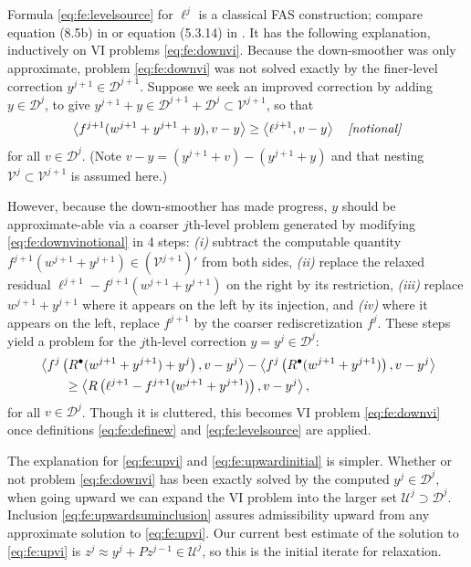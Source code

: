 \documentclass[review,hidelinks,onefignum,onetabnum,final]{siamart220329}  %
\newcommand{\cV}{\mathcal{V}}
\newcommand{\ip}[2]{\left<#1,#2\right>}
\newcommand{\iR}{R^{\bullet}}
\begin{document}
Formula \eqref{eq:fe:levelsource} for $\ell^j$ is a classical FAS construction; compare equation (8.5b) in \cite{BrandtLivne2011} or equation (5.3.14) in \cite{Trottenbergetal2001}.  It has the following explanation, inductively on VI problems \eqref{eq:fe:downvi}.  Because the down-smoother was only approximate, problem \eqref{eq:fe:downvi} was not solved exactly by the finer-level correction $y^{j+1} \in \mathcal{D}^{j+1}$.  Suppose we seek an improved correction by adding $y \in \mathcal{D}^{j}$, to give $y^{j+1}+y \in \mathcal{D}^{j+1}+\mathcal{D}^j \subset \cV^{j+1}$, so that
\begin{equation}
\ip{f^{j+1}(w^{j+1}+y^{j+1}+y)}{v-y} \ge \ip{\ell^{j+1}}{v-y} \quad \text{\emph{[notional]}} \label{eq:fe:downvinotional}
\end{equation}
for all $v \in \mathcal{D}^j$.  (Note $v-y = (y^{j+1}+v)-(y^{j+1}+y)$ and that nesting $\cV^j \subset \cV^{j+1}$ is assumed here.)

However, because the down-smoother has made progress, $y$ should be approximate-able via a coarser $j$th-level problem generated by modifying \eqref{eq:fe:downvinotional} in 4 steps: \emph{(i)} subtract the computable quantity $f^{j+1}(w^{j+1}+y^{j+1}) \in (\mathcal{V}^{j+1})'$ from both sides, \emph{(ii)} replace the relaxed residual $\ell^{j+1}-f^{j+1}(w^{j+1}+y^{j+1})$ on the right by its restriction, \emph{(iii)} replace $w^{j+1}+y^{j+1}$ where it appears on the left by its injection, and \emph{(iv)} where it appears on the left, replace $f^{j+1}$ by the coarser rediscretization $f^j$.  These steps yield a problem for the $j$th-level correction $y=y^j \in \mathcal{D}^j$:
\begin{align}
&\ip{f^j\left(\iR(w^{j+1}+y^{j+1})+y^j\right)}{v-y^j} - \ip{f^j\left(\iR(w^{j+1}+y^{j+1})\right)}{v-y^j} \label{eq:fe:downvicluttered} \\
&\qquad \ge \ip{R\left(\ell^{j+1}-f^{j+1}(w^{j+1}+y^{j+1})\right)}{v-y^j}, \notag
\end{align}
for all $v\in \mathcal{D}^{j}$.  Though it is cluttered, this becomes VI problem \eqref{eq:fe:downvi} once definitions \eqref{eq:fe:definew} and \eqref{eq:fe:levelsource} are applied.

The explanation for \eqref{eq:fe:upvi} and \eqref{eq:fe:upwardinitial} is simpler.  Whether or not problem \eqref{eq:fe:downvi} has been exactly solved by the computed $y^j\in\mathcal{D}^j$, when going upward we can expand the VI problem into the larger set $\mathcal{U}^j \supset \mathcal{D}^j$.  Inclusion \eqref{eq:fe:upwardsuminclusion} assures admissibility upward from any approximate solution to \eqref{eq:fe:upvi}.  Our current best estimate of the solution to \eqref{eq:fe:upvi} is $z^j \approx y^j + Pz^{j-1}\in \mathcal{U}^j$, so this is the initial iterate for relaxation.
\end{document}

